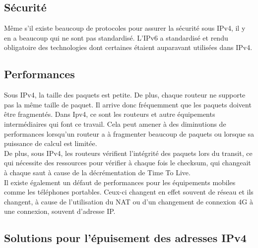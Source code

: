 \subsection{Sécurité}
Même s'il existe beaucoup de protocoles pour assurer la sécurité sous IPv4, il y en a 
beaucoup qui ne sont pas standardisé. L'IPv6 a standardisé et rendu obligatoire des 
technologies dont certaines étaient auparavant utilisées dans IPv4. 

\subsection{Performances}
Sous IPv4, la taille des paquets est petite. De plus, chaque routeur ne supporte pas la même taille
de paquet. Il arrive donc fréquemment que les paquets doivent être fragmentés. Dans Ipv4, ce sont les 
routeurs et autre équipements intermédiaires qui font ce travail. Cela peut amener à
des diminutions de performances lorsqu'un routeur a à fragmenter beaucoup de paquets ou
lorsque sa puissance de calcul est limitée. 
\\
De plus, sous IPv4, les routeurs vérifient l'intégrité des paquets lors du transit, ce qui nécessite 
des ressources pour vérifier à chaque fois le checksum, qui changeait à chaque saut à cause
de la décrémentation de Time To Live.
\\
Il existe également un défaut de performances pour les équipements mobiles comme les téléphones 
portables. Ceux-ci changent en effet souvent de réseau et ils changent, à cause de 
l'utilisation du NAT ou d'un changement de connexion 4G à une connexion, souvent d'adresse IP. 
\\


\subsection{Solutions pour l'épuisement des adresses IPv4}

